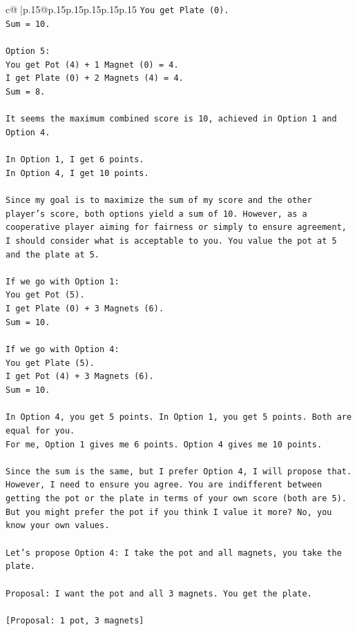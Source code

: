 \documentclass{article}
\begin{document}
{\begin{supertabular}{c@{$\;$}|p{.15\linewidth}@{}p{.15\linewidth}p{.15\linewidth}p{.15\linewidth}p{.15\linewidth}p{.15\linewidth}}
{{{\texttt{You get Plate (0).} \\
\texttt{Sum = 10.} \\
\\ 
\texttt{Option 5:} \\
\texttt{You get Pot (4) + 1 Magnet (0) = 4.} \\
\texttt{I get Plate (0) + 2 Magnets (4) = 4.} \\
\texttt{Sum = 8.} \\
\\ 
\texttt{It seems the maximum combined score is 10, achieved in Option 1 and Option 4.} \\
\\ 
\texttt{In Option 1, I get 6 points.} \\
\texttt{In Option 4, I get 10 points.} \\
\\ 
\texttt{Since my goal is to maximize the sum of my score and the other player's score, both options yield a sum of 10. However, as a cooperative player aiming for fairness or simply to ensure agreement, I should consider what is acceptable to you. You value the pot at 5 and the plate at 5.} \\
\\ 
\texttt{If we go with Option 1:} \\
\texttt{You get Pot (5).} \\
\texttt{I get Plate (0) + 3 Magnets (6).} \\
\texttt{Sum = 10.} \\
\\ 
\texttt{If we go with Option 4:} \\
\texttt{You get Plate (5).} \\
\texttt{I get Pot (4) + 3 Magnets (6).} \\
\texttt{Sum = 10.} \\
\\ 
\texttt{In Option 4, you get 5 points. In Option 1, you get 5 points. Both are equal for you.} \\
\texttt{For me, Option 1 gives me 6 points. Option 4 gives me 10 points.} \\
\\ 
\texttt{Since the sum is the same, but I prefer Option 4, I will propose that. However, I need to ensure you agree. You are indifferent between getting the pot or the plate in terms of your own score (both are 5). But you might prefer the pot if you think I value it more? No, you know your own values.} \\
\\ 
\texttt{Let's propose Option 4: I take the pot and all magnets, you take the plate.} \\
\\ 
\texttt{Proposal: I want the pot and all 3 magnets. You get the plate.} \\
\\ 
\texttt{{[}Proposal: 1 pot, 3 magnets{]}} \\
            }
        }
    }
     \\ \\


\end{supertabular}}
\end{document}
